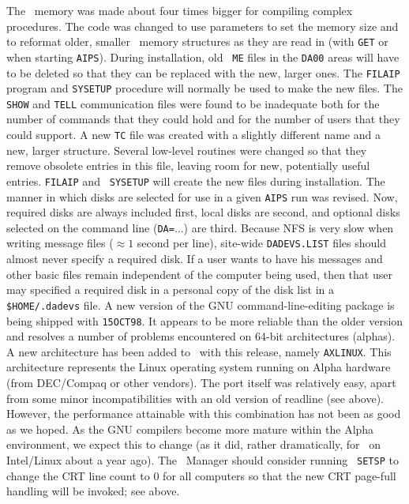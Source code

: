 \begin{description}
 The \POPS\ memory was made about four times bigger
   for compiling complex procedures.  The code was changed to use
   parameters to set the memory size and to reformat older, smaller
   \POPS\ memory structures as they are read in (with {\tt GET} or
   when starting \hbox{{\tt AIPS}}).  During installation, old {\tt
   ME} files in the {\tt DA00} areas will have to be deleted so that
   they can be replaced with the new, larger ones.  The {\tt FILAIP}
   program and {\tt SYSETUP} procedure will normally be used to make
   the new files.
 The {\tt SHOW} and {\tt TELL} communication files
   were found to be inadequate both for the number of commands that
   they could hold and for the number of users that they could
   support.  A new {\tt TC} file was created with a slightly different
   name and a new, larger structure.  Several low-level routines were
   changed so that they remove obsolete entries in this file, leaving
   room for new, potentially useful entries.  {\tt FILAIP} and {\tt
   SYSETUP} will create the new files during installation.
 The manner in which disks are selected for use in a
   given {\tt AIPS} run was revised.  Now, required disks are always
   included first, local disks are second, and optional disks selected
   on the command line ({\tt DA=}$\ldots$) are third.  Because NFS is
   very slow when writing message files ($\approx 1$ second per line),
   site-wide {\tt DADEVS.LIST} files should almost never specify a
   required disk.  If a user wants to have his messages and other
   basic files remain independent of the computer being used, then
   that user may specified a required disk in a personal copy of the
   disk list in a {\tt \$HOME/.dadevs} file.
 A new version of the GNU command-line-editing
   package is being shipped with \hbox{{\tt 15OCT98}}.  It appears to
   be more reliable than the older version and resolves a number of
   problems encountered on 64-bit architectures (alphas).
 A new architecture has been added to \AIPS\ with this
   release, namely {\tt AXLINUX}.  This architecture represents the
   Linux operating system running on Alpha hardware (from DEC/Compaq
   or other vendors).  The port itself was relatively easy, apart from
   some minor incompatibilities with an old version of readline (see
   above).  However, the performance attainable with this combination
   has not been as good as we hoped.  As the GNU compilers become more
   mature within the Alpha environment, we expect this to change (as
   it did, rather dramatically, for \AIPS\ on Intel/Linux about a year
   ago).
 The \AIPS\ Manager should consider running {\tt
   SETSP} to change the CRT line count to $0$ for all computers so
   that the new CRT page-full handling will be invoked; see above.
\end{description}

